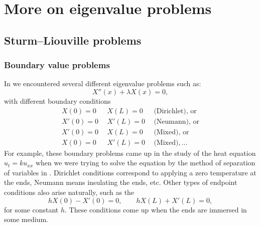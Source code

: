 \chapter{More on eigenvalue problems} \label{SL:chapter}


\section{Sturm--Liouville problems}
\label{slproblems:section}


\subsection{Boundary value problems}

In 
we encountered several different eigenvalue problems such as:
\begin{equation*}
X''(x) + \lambda X(x) = 0 ,
\end{equation*}
with different boundary
conditions%
%
\begin{equation*}
\begin{array}{rrl}
X(0) = 0 & ~~X(L) = 0 & ~~\text{(Dirichlet), or} \\
X'(0) = 0 & ~~X'(L) = 0 & ~~\text{(Neumann), or} \\
X'(0) = 0 & ~~X(L) = 0 & ~~\text{(Mixed), or} \\
X(0) = 0 & ~~X'(L) = 0 & ~~\text{(Mixed)}, \ldots
\end{array}
\end{equation*}
For example,
these boundary problems came up in the study of the heat equation $u_t =
k u_{xx}$ when we were trying to solve the equation by the method of
separation of variables in .
Dirichlet conditions correspond to applying a
zero temperature at the ends, Neumann means insulating the ends, etc.
Other types of endpoint conditions also arise naturally, such as
the \emph{}
\begin{equation*}
hX(0) - X'(0) = 0, \qquad hX(L) + X'(L) = 0 ,
\end{equation*}
for some constant $h$.  These conditions come up when the ends are immersed
in some medium.

